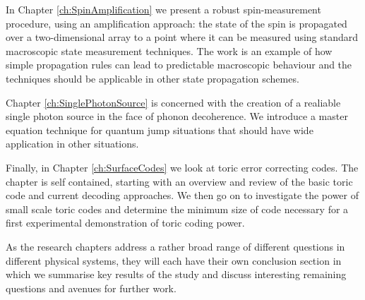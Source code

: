 In Chapter \ref{ch:SpinAmplification} we present a robust spin-measurement procedure, using an amplification approach: the state of the spin is propagated over a two-dimensional array to a point where it can be measured using standard macroscopic state measurement techniques. The work is an example of how simple propagation rules can lead to predictable macroscopic behaviour and the techniques should be applicable in other state propagation schemes.

Chapter \ref{ch:SinglePhotonSource} is concerned with the creation of a realiable single photon source in the face of phonon decoherence. We introduce a master equation technique for quantum jump situations that should have wide application in other situations.

Finally, in Chapter \ref{ch:SurfaceCodes} we look at toric error correcting codes. The chapter is self contained, starting with an overview and review of the basic toric code and current decoding approaches. We then go on to investigate the power of small scale toric codes and determine the minimum size of code necessary for a first experimental demonstration of toric coding power.

As the research chapters address a rather broad range of different questions in different physical systems, they will each have their own conclusion section in which we summarise key results of the study and discuss interesting remaining questions and avenues for further work.


